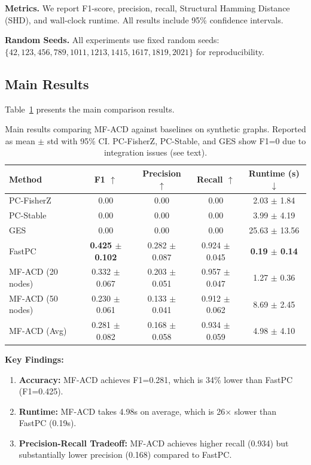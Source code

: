 \documentclass{article}
\begin{document}
\textbf{Metrics.} We report F1-score, precision, recall, Structural Hamming Distance (SHD), and wall-clock runtime. All results include 95\% confidence intervals.

\textbf{Random Seeds.} All experiments use fixed random seeds: $\{42, 123, 456, 789, 1011, 1213, 1415, 1617, 1819, 2021\}$ for reproducibility.

\subsection{Main Results}

Table~\ref{tab:main} presents the main comparison results.

\begin{table}[t]
\caption{Main results comparing MF-ACD against baselines on synthetic graphs. Reported as mean $\pm$ std with 95\% CI. PC-FisherZ, PC-Stable, and GES show F1=0 due to integration issues (see text).}
\label{tab:main}
\centering
\begin{tabular}{lcccc}
\toprule
Method & F1 $\uparrow$ & Precision $\uparrow$ & Recall $\uparrow$ & Runtime (s) $\downarrow$ \\
\midrule
PC-FisherZ & 0.00 & 0.00 & 0.00 & 2.03 $\pm$ 1.84 \\
PC-Stable & 0.00 & 0.00 & 0.00 & 3.99 $\pm$ 4.19 \\
GES & 0.00 & 0.00 & 0.00 & 25.63 $\pm$ 13.56 \\
FastPC & \textbf{0.425 $\pm$ 0.102} & 0.282 $\pm$ 0.087 & 0.924 $\pm$ 0.045 & \textbf{0.19 $\pm$ 0.14} \\
\midrule
MF-ACD (20 nodes) & 0.332 $\pm$ 0.067 & 0.203 $\pm$ 0.051 & 0.957 $\pm$ 0.047 & 1.27 $\pm$ 0.36 \\
MF-ACD (50 nodes) & 0.230 $\pm$ 0.061 & 0.133 $\pm$ 0.041 & 0.912 $\pm$ 0.062 & 8.69 $\pm$ 2.45 \\
MF-ACD (Avg) & 0.281 $\pm$ 0.082 & 0.168 $\pm$ 0.058 & 0.934 $\pm$ 0.059 & 4.98 $\pm$ 4.10 \\
\bottomrule
\end{tabular}
\end{table}

\textbf{Key Findings:}
\begin{enumerate}
    \item \textbf{Accuracy:} MF-ACD achieves F1=0.281, which is 34\% lower than FastPC (F1=0.425).
    \item \textbf{Runtime:} MF-ACD takes 4.98s on average, which is 26$\times$ slower than FastPC (0.19s).
    \item \textbf{Precision-Recall Tradeoff:} MF-ACD achieves higher recall (0.934) but substantially lower precision (0.168) compared to FastPC.
\end{enumerate}
\end{document}
